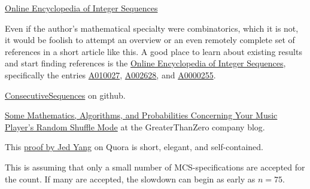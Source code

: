 \documentclass{article}
\begin{document}

\begin{thebibliography}{0}

  \href{http://oeis.org/}{Online Encyclopedia of Integer Sequences}



  Even if the author's mathematical specialty were combinatorics, which it is not,
  it would be foolish to attempt an overview or an even remotely complete set of references
  in a short article like this. A good place to learn about existing results and start finding
  references is the \href{http://oeis.org/}{Online Encyclopedia of Integer Sequences}, specifically
 the entries \href{http://oeis.org/A010027}{A010027}, \href{http://oeis.org/A002628}{A002628}, and
  \href{http://oeis.org/A000255}{A0000255}.

    \href{https://github.com/walkswiththebear/ConsecutiveSequences}{ConsecutiveSequences} on github.

    \href{http://blog.greaterthanzero.com/post/159874910652/some-mathematics-algorithms-and-probabilities}{Some Mathematics, Algorithms, and Probabilities Concerning Your Music Player’s Random Shuffle Mode} at the GreaterThanZero company blog. 

 This \href{https://www.quora.com/What-is-the-probability-that-a-shuffled-music-album-will-have-at-least-two-songs-in-their-original-relative-consecutive-order}{proof by Jed Yang}
  on Quora is short, elegant, and self-contained.

  This is assuming that only a small number of MCS-specifications are accepted for the count. If many are accepted,
  the slowdown can begin as early as $n=75$.
  
\end{thebibliography}
\end{document}
